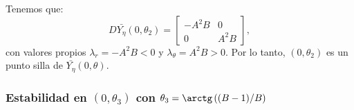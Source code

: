 Tenemos que:
\begin{equation*}
	D\bar{Y_{\eta}}(0,\theta_2) =
	\begin{bmatrix}
			-A^{2}B  & 0 \\
			0 & A^{2}B
		\end{bmatrix},
	\label{eq:jacobianaModelo2PolarEn(0,pi2)}
\end{equation*}
con valores propios $\lambda_r = -A^{2}B<0$ y $\lambda_\theta = A^{2}B>0$. Por lo tanto, $\left(0,\theta_2\right)$ es un punto silla de $\bar{Y_{\eta}}(0,\theta)$.

\subsubsection*{Estabilidad en $(0, \theta_3)$ con $\theta_3=\arctg\left((B-1)/B\right)$}

